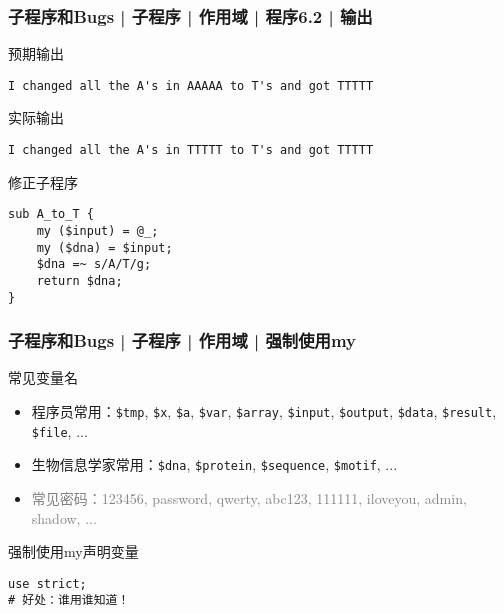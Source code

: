 \begin{frame}[fragile]
  \frametitle{子程序和Bugs | 子程序 | 作用域 | 程序6.2 | 输出}
  \begin{block}{预期输出}
\begin{lstlisting}[basicstyle=\footnotesize\tt]
I changed all the A's in AAAAA to T's and got TTTTT 
\end{lstlisting}
  \end{block}
  \pause
  \begin{block}{实际输出}
\begin{lstlisting}[basicstyle=\footnotesize\tt]
I changed all the A's in TTTTT to T's and got TTTTT 
\end{lstlisting}
  \end{block}
  \pause
  \begin{block}{修正子程序}
\begin{lstlisting}[basicstyle=\small\tt]
sub A_to_T {
    my ($input) = @_;
    my ($dna) = $input;
    $dna =~ s/A/T/g;
    return $dna;
}
\end{lstlisting}
  \end{block}
\end{frame}

\begin{frame}[fragile]
  \frametitle{子程序和Bugs | 子程序 | 作用域 | 强制使用my}
  \begin{block}{常见变量名}
    \begin{itemize}
      \item 程序员常用：\verb|$tmp|, \verb|$x|, \verb|$a|, \verb|$var|, \verb|$array|, \verb|$input|, \verb|$output|, \verb|$data|, \verb|$result|, \verb|$file|, ...
      \item 生物信息学家常用：\verb|$dna|, \verb|$protein|, \verb|$sequence|, \verb|$motif|, ...
      \item \textcolor{gray}{常见密码：123456, password, qwerty, abc123, 111111, iloveyou, admin, shadow, ...}
    \end{itemize}
  \end{block}
  \pause
  \begin{block}{强制使用my声明变量}
\begin{lstlisting}
use strict;
# 好处：谁用谁知道！
\end{lstlisting}
  \end{block}
\end{frame}

